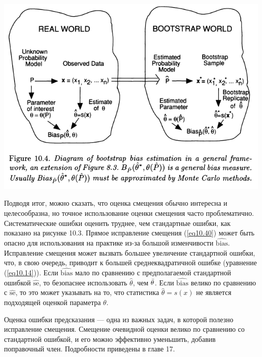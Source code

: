 \noindent
\includegraphics[width=\linewidth]{10/f10.4.png}
\newline

Подводя итог, можно сказать, что оценка смещения обычно интересна и целесообразна, но точное использование оценки смещения часто проблематично. Систематические ошибки оценить труднее, чем стандартные ошибки, как показано на рисунке 10.3. Прямое исправление смещения (\ref{eq10.40}) может быть опасно для использования на практике из-за большой изменчивости $\widehat{\text{bias}}$. Исправление смещения может вызвать большее увеличение стандартной ошибки, что, в свою очередь, приводит к большей среднеквадратичной ошибке (уравнение (\ref{eq10.14})). Если $\widehat{\text{bias}}$ мало по сравнению с предполагаемой стандартной ошибкой $\widehat{\text{se}}$, то безопаснее использовать $\hat{\theta}$, чем $\Bar{\theta}$. Если $\widehat{\text{bias}}$ велико по сравнению с $\widehat{\text{se}}$, то это может указывать на то, что статистика $\hat{\theta} = s(x)$ не является подходящей оценкой параметра $\theta$.

Оценка ошибки предсказания --- одна из важных задач, в которой полезно исправление смещения. Смещение очевидной оценки велико по сравнению со стандартной ошибкой, и его можно эффективно уменьшить, добавив поправочный член. Подробности приведены в главе 17.